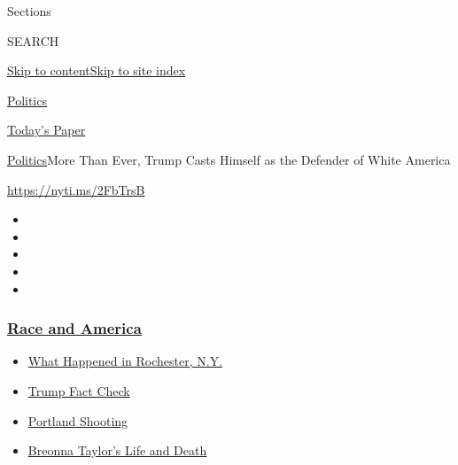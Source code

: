Sections

SEARCH

\protect\hyperlink{site-content}{Skip to
content}\protect\hyperlink{site-index}{Skip to site index}

\href{https://www.nytimes3xbfgragh.onion/section/politics}{Politics}

\href{https://myaccount.nytimes3xbfgragh.onion/auth/login?response_type=cookie\&client_id=vi}{}

\href{https://www.nytimes3xbfgragh.onion/section/todayspaper}{Today's
Paper}

\href{/section/politics}{Politics}\textbar{}More Than Ever, Trump Casts
Himself as the Defender of White America

\url{https://nyti.ms/2FbTrsB}

\begin{itemize}
\item
\item
\item
\item
\item
\end{itemize}

\hypertarget{race-and-america}{%
\subsubsection{\texorpdfstring{\href{https://www.nytimes3xbfgragh.onion/news-event/george-floyd-protests-minneapolis-new-york-los-angeles?name=styln-george-floyd\&region=TOP_BANNER\&block=storyline_menu_recirc\&action=click\&pgtype=Article\&impression_id=30917540-f286-11ea-828f-7bf945cdf89b\&variant=undefined}{Race
and America}}{Race and America}}\label{race-and-america}}

\begin{itemize}
\tightlist
\item
  \href{https://www.nytimes3xbfgragh.onion/2020/09/04/nyregion/rochester-police-daniel-prude.html?name=styln-george-floyd\&region=TOP_BANNER\&block=storyline_menu_recirc\&action=click\&pgtype=Article\&impression_id=30919c50-f286-11ea-828f-7bf945cdf89b\&variant=undefined}{What
  Happened in Rochester, N.Y.}
\item
  \href{https://www.nytimes3xbfgragh.onion/2020/09/01/us/politics/trump-fact-check-protests.html?name=styln-george-floyd\&region=TOP_BANNER\&block=storyline_menu_recirc\&action=click\&pgtype=Article\&impression_id=30919c51-f286-11ea-828f-7bf945cdf89b\&variant=undefined}{Trump
  Fact Check}
\item
  \href{https://www.nytimes3xbfgragh.onion/2020/08/30/us/portland-shooting-explained.html?name=styln-george-floyd\&region=TOP_BANNER\&block=storyline_menu_recirc\&action=click\&pgtype=Article\&impression_id=30919c52-f286-11ea-828f-7bf945cdf89b\&variant=undefined}{Portland
  Shooting}
\item
  \href{https://www.nytimes3xbfgragh.onion/2020/08/30/us/breonna-taylor-police-killing.html?name=styln-george-floyd\&region=TOP_BANNER\&block=storyline_menu_recirc\&action=click\&pgtype=Article\&impression_id=30919c53-f286-11ea-828f-7bf945cdf89b\&variant=undefined}{Breonna
  Taylor's Life and Death}
\end{itemize}

